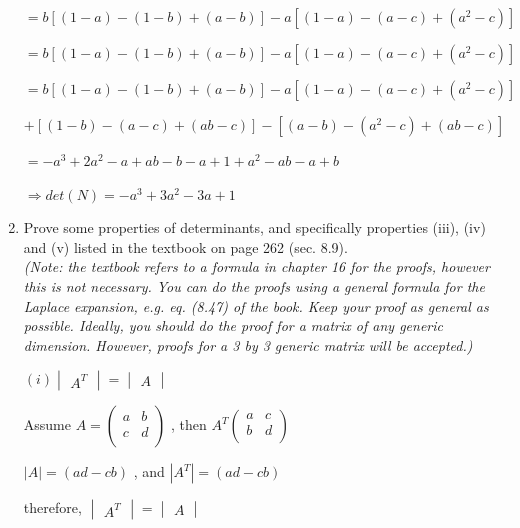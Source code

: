 \documentclass[fleqn]{article}
\begin{document}
\begin{enumerate}
      \bigbreak

      \textcolor{hwColor}{$=b\left[(1-a)-(1-b)+(a-b)\right]-a\left[(1-a)-(a-c)+(a^2-c)\right]$}

      \textcolor{hwColor}{$=b\left[(1-a)-(1-b)+(a-b)\right]-a\left[(1-a)-(a-c)+(a^2-c)\right]$}

      \textcolor{hwColor}{$=b\left[(1-a)-(1-b)+(a-b)\right]-a\left[(1-a)-(a-c)+(a^2-c)\right]$}

      \textcolor{hwColor}{$+\left[(1-b)-(a-c)+(ab-c)\right]-\left[(a-b)-(a^2-c)+(ab-c)\right]$}

      \textcolor{hwColor}{$=-a^3+2a^2-a+ab-b-a+1+a^2-ab-a+b$}
   
      \textcolor{hwColor}{    
        $
        \Longrightarrow
        det(N)=-a^3+3a^2-3a+1
        $
      }


    \item Prove some properties of determinants, and specifically properties (iii), (iv) and (v) listed in the textbook on page 262 (sec. 8.9). \\
    \emph{(Note: the textbook refers to a formula in chapter 16 for the proofs, however this is not necessary. You can do the proofs using a general formula for the Laplace expansion, e.g. eq. (8.47) of the book. Keep your proof as general as possible. Ideally, you should do the proof for a matrix of any generic dimension. However, proofs for a 3 by 3 generic matrix will be accepted.) }

    $(i) \begin{vmatrix}
      A^T
    \end{vmatrix}=
    \begin{vmatrix}
      A
    \end{vmatrix}
    $

    \textcolor{hwColor}{
      Assume
      $
      A=\begin{pmatrix}
        a & b \\
        c & d \\
      \end{pmatrix}
      $
      , then
      $
      A^T\begin{pmatrix}
        a & c \\
        b & d \\
      \end{pmatrix}
      $
    }

    \textcolor{hwColor}{
      $
        |A|=(ad-cb)
      $
      , and
      $
      |A^T|=(ad-cb)
      $
    }

    \textcolor{hwColor}{
      therefore, 
      $
      \begin{vmatrix}
        A^T
      \end{vmatrix}=
      \begin{vmatrix}
        A
      \end{vmatrix}
      $
    }


\end{enumerate}
\end{document}
